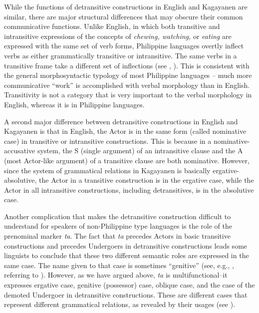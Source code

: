 While the functions of detransitive constructions in English and Kagayanen are similar, there are major structural differences that may obscure their common communicative functions. Unlike English, in which both transitive and intransitive expressions of the concepts of \textit{chewing, watching,} or \textit{eating} are expressed with the same set of verb forms, Philippine languages overtly inflect verbs as either grammatically transitive or intransitive.  The same verbs in a transitive frame take a different set of inflections (see , ). This is consistent with the general morphosyntactic typology of most Philippine languages – much more communicative “work” is accomplished with verbal morphology than in English. Transitivity is not  a category that is very important to the verbal morphology in English, whereas it is in Philippine languages.

A second major difference between detransitive constructions in English and Kagayanen is that in English, the Actor is in the same form (called nominative case) in transitive or intransitive constructions. This is because in a nominative-accusative system, the S (single argument) of an intransitive clause and the A (most Actor-like argument) of a transitive clause are both nominative. However, since the system of grammatical relations in Kagayanen is basically ergative-absolutive, the Actor in a transitive construction is in the ergative case, while the Actor in all intransitive constructions, including detransitives, is in the absolutive case.

Another complication that makes the detransitive construction difficult to understand for speakers of non-Philippine type languages is the role of the prenominal marker \textit{ta}. The fact that \textit{ta} precedes Actors in basic transitive constructions and precedes Undergoers in detransitive constructions leads some linguists to conclude that these two different semantic roles are expressed in the same case. The name given to that case is sometimes “genitive” (see, e.g., \citealt{kroeger1993}, referring to ). However, as we have argued above, \textit{ta} is multifunctional--it expresses ergative case, genitive (possessor) case, oblique case, and the case of the demoted Undergoer in detransitive constructions. These are different cases that represent different grammatical relations, as revealed by their usages (see ).

